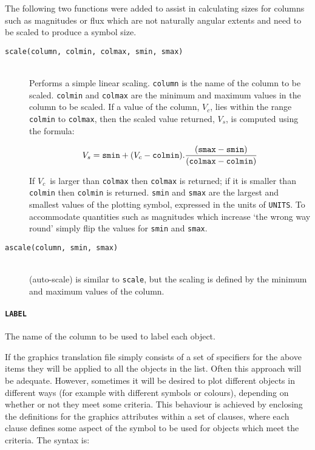 \documentclass[twoside,11pt]{article}
\renewcommand{\_}{\texttt{\symbol{95}}}
\begin{document}
The following two functions were added to assist in calculating sizes for
columns such as magnitudes or flux which are not naturally angular extents
and need to be scaled to produce a symbol size.

\begin{description}

  \item[{\tt scale(column, colmin, colmax, smin, smax)}] ~
  \\ Performs a simple linear scaling.  {\tt column} is the name of
   the column to be scaled.  {\tt colmin} and {\tt colmax} are the
   minimum and maximum values in the column to be scaled.  If a
   value of the column, $V_{c}$, lies within the range {\tt colmin}
   to {\tt colmax}, then the scaled value returned, $V_{s}$, is
   computed using the formula:

  \begin{equation}
   V_{s} = {\tt smin} + (V_{c} - {\tt colmin}) .
   \frac{({\tt smax} - {\tt smin} ) }{({\tt colmax} - {\tt colmin} ) }
  \end{equation}

   If $V_{c}$\, is larger than {\tt colmax} then {\tt colmax} is
   returned; if it is smaller than {\tt colmin} then {\tt colmin} is
   returned.  {\tt smin} and {\tt smax} are the largest and smallest
   values of the plotting symbol, expressed in the units of {\tt UNITS}.
   To accommodate quantities such as magnitudes which increase `the
   wrong way round' simply flip the values for {\tt smin} and {\tt smax}.

  \item[{\tt ascale(column, smin, smax)}] ~
  \\ (auto-scale) is similar to {\tt scale}, but the scaling is defined by
   the minimum and maximum values of the column.

\end{description}

\paragraph{{\tt LABEL}} The name of the column to be used to label each object.

\vspace{5mm}

If the graphics translation file simply consists of a set of specifiers
for the above items they will be applied to all the objects in the list.
Often this approach will be adequate.  However, sometimes it will be
desired to plot different objects in different ways (for example with
different symbols or colours), depending on whether or not they meet
some criteria.  This behaviour is achieved by enclosing the definitions
for the graphics attributes within a set of clauses, where each clause
defines some aspect of the symbol to be used for objects which meet the
criteria.  The syntax is:
\end{document}
